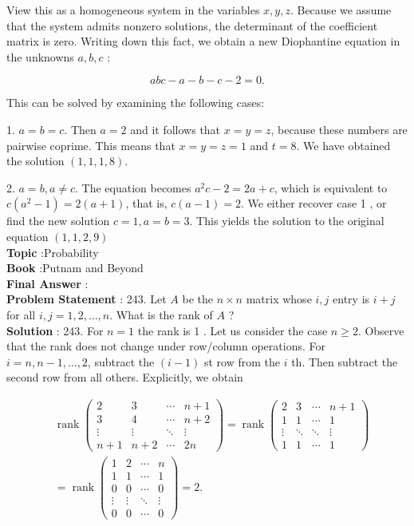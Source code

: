 \documentclass[10pt]{article}
\begin{document}
View this as a homogeneous system in the variables $x, y, z$. Because we assume that the system admits nonzero solutions, the determinant of the coefficient matrix is zero. Writing down this fact, we obtain a new Diophantine equation in the unknowns $a, b, c$ :

$$
a b c-a-b-c-2=0 .
$$

This can be solved by examining the following cases:

1. $a=b=c$. Then $a=2$ and it follows that $x=y=z$, because these numbers are pairwise coprime. This means that $x=y=z=1$ and $t=8$. We have obtained the solution $(1,1,1,8)$.

2. $a=b, a \neq c$. The equation becomes $a^{2} c-2=2 a+c$, which is equivalent to $c\left(a^{2}-1\right)=2(a+1)$, that is, $c(a-1)=2$. We either recover case 1 , or find the new solution $c=1, a=b=3$. This yields the solution to the original equation $(1,1,2,9)$
\\
\textbf{Topic} :Probability\\
\textbf{Book} :Putnam and Beyond\\
\textbf{Final Answer} :\\


\textbf{Problem Statement} :
243. Let $A$ be the $n \times n$ matrix whose $i, j$ entry is $i+j$ for all $i, j=1,2, \ldots, n$. What is the rank of $A$ ?
\\
\textbf{Solution} :
243. For $n=1$ the rank is 1 . Let us consider the case $n \geq 2$. Observe that the rank does not change under row/column operations. For $i=n, n-1, \ldots, 2$, subtract the $(i-1)$ st row from the $i$ th. Then subtract the second row from all others. Explicitly, we obtain 

$$
\begin{aligned}
& \operatorname{rank}\left(\begin{array}{cccc}2 & 3 & \cdots & n+1 \\3 & 4 & \cdots & n+2 \\\vdots & \vdots & \ddots & \vdots \\n+1 & n+2 & \cdots & 2 n\end{array}\right)=\operatorname{rank}\left(\begin{array}{cccc}2 & 3 & \cdots & n+1 \\1 & 1 & \cdots & 1 \\\vdots & \ddots & \ddots & \vdots \\1 & 1 & \cdots & 1\end{array}\right) \\
& =\operatorname{rank}\left(\begin{array}{cccc}1 & 2 & \cdots & n \\1 & 1 & \cdots & 1 \\0 & 0 & \cdots & 0 \\\vdots & \vdots & \ddots & \vdots \\0 & 0 & \cdots & 0\end{array}\right)=2 \text {. }
\end{aligned}
$$
\end{document}
